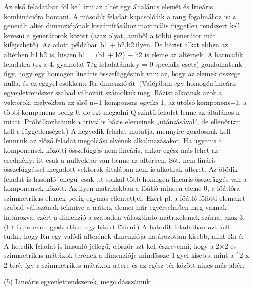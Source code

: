 \begin{frame}
  \begin{tcolorbox}[title={4/7. -Q-}]
Az első feladatban föl kell írni az altér egy általános elemét és lineáris kombinációra bontani. A második feladat kapcsolódik a rang fogalmához is: a generált altér dimenziójának kiszámításához maximális független rendszert kell keresni a generátorok között (azaz olyat, amiből a többi generátor már kifejezhető). Az adott példában {b1 + b2,b2} ilyen. De bázist alkot ebben az altérben {b1,b2} is, hiszen b1 = (b1 + b2) − b2 is eleme az altérnek. A harmadik feladatra (ez a 4. gyakorlat 7/g feladatának y = 0 speciális esete) gondolhatunk úgy, hogy egy homogén lineáris összefüggésünk van: az, hogy az elemek összege nulla, és ez eggyel csökkenti Rn dimenzióját. (Valójában egy homogén lineáris egyenletrendszer szabad változóit számoltuk meg. Bázist alkotnak azok a vektorok, melyekben az első n−1 komponens egyike 1, az utolsó komponens−1, a többi komponens pedig 0, de ezt megadni Q szintű feladat lenne az általános n miatt. Próbálkozhatunk a triviális bázis elemeinek „utánzásával”, de ellenőrizni kell a függetlenséget.) A negyedik feladat mutatja, mennyire gondosnak kell lennünk az előző feladat megoldási elvének alkalmazásakor. Ha ugyanis a komponensek közötti összefüggés nem lineáris, akkor egész más lehet az eredmény: itt csak a nullvektor van benne az altérben. Sőt, nem lináris összefüggéssel megadott vektorok általában nem is alkotnak alteret. Az ötödik feladat is hasonló jellegű, csak itt sokkal több homogén lineáris összefüggés van a komponensek között. Az ilyen mátrixokban a főátló minden eleme 0, a főátlóra szimmetrikus elemek pedig egymás ellentettjei. Ezért pl. a főátló fölötti elemeket szabad változónak tekintve a mátrix elemei már egyértelműen meg vannak határozva, ezért a dimenzió a szabadon választható mátrixelemek száma, azaz 3. (Itt is érdemes gyakorlásul egy bázist fölírni.) A hatodik feladatban azt kell tudni, hogy Rn egy valódi alterének dimenziója határozottan kisebb, mint Rn-é. A hetedik feladat is hasonló jellegű, először azt kell észrevenni, hogy a 2×2-es szimmetrikus mátrixok terének a dimenziója mindössze 1-gyel kisebb, mint a ^{2 x 2} téré, így a szimmetrikus mátrixok altere és az egész tér között nincs más altér.
  \end{tcolorbox}
\end{frame}



\begin{frame}[plain]
\begin{tcolorbox}[center, colback={myyellow}, coltext={black}, colframe={myyellow}]
    {\RHuge  (5) Lineáris egyenletrendszerek, megoldásszámuk}
    \mmedskip
\end{tcolorbox}
\end{frame}

